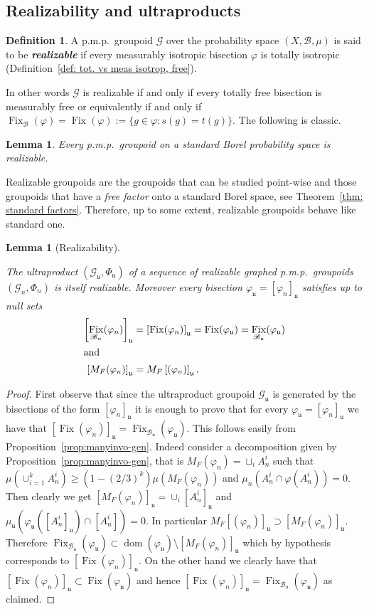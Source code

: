 \documentclass[10pt]{amsart}
\newtheorem{lemm}[cdrthm]{Lemma}
\theoremstyle{definition}
\newtheorem{defi}[cdrthm]{Definition}
\newcommand{\defin}[1]{\textbf{\emph{#1}}}
\newcommand{\cg}{\mathcal{G}}
\newcommand{\rb}{\mathscr{B}}
\DeclareMathOperator{\dom}{dom}
\DeclareMathOperator{\Fix}{Fix}
\newcommand{\ul}{\mathfrak{u}}
\newcommand{\ph}{\varphi}
\newcommand{\pmp}{p.m.p.\ }
\begin{document}
\subsection{Realizability and ultraproducts}\label{subsect: realizability}

\begin{defi}\label{dfn:realizable}
A \pmp groupoid $\cg$ over the probability space $(X,\rb,\mu)$ is said to be
\defin{realizable} if every measurably isotropic bisection $\ph$ is totally isotropic (Definition~\ref{def: tot. vs meas isotrop, free}).
\end{defi}

In other words $\cg$ is realizable if and only if every totally free bisection is measurably free or equivalently if and only if $\Fix_{\rb}({\ph})=\Fix ({\ph}):= \{g\in \ph: s(g)=t(g)\}$. The following is classic.

\begin{lemm}
Every \pmp groupoid on a standard Borel probability space is realizable.
\end{lemm}

Realizable groupoids are the groupoids that can be studied point-wise and those groupoids that have a \emph{free factor} onto a standard Borel space, see Theorem~\ref{thm: standard factors}. Therefore, up to some extent, realizable groupoids behave like standard one.

\begin{lemm}[Realizability]\label{lem:realizab ultralim and fix}

The ultraproduct $(\cg_\ul, \Phi_\ul)$ of a sequence of realizable graphed \pmp groupoids $(\cg_n, \Phi_n)$ is itself realizable. Moreover every bisection $\ph_\ul=[\ph_n]_\ul$ satisfies up to null sets
\begin{align*}
\left[\Fix_{\rb_n}({\ph_n})\right]_{\ul}&= \left[\Fix({\ph_n})\right]_{\ul}= \Fix (\ph_{\ul})=\Fix_{\rb_\ul}(\ph_\ul)\\
\intertext{and}
\left[M_F(\ph_n)\right]_\ul&=M_F\left[(\ph_n)\right]_\ul.
\end{align*}
\end{lemm}
\begin{proof}
First observe that since the ultraproduct groupoid $\cg_\ul$ is generated by the bisections of the form $[\ph_n]_\ul$ it is enough to prove that for every $\ph_\ul=[\ph_n]_\ul$ we have that $[\Fix({\ph_n})]_{\ul}=\Fix_{\rb_\ul}(\ph_\ul)$. This follows easily from Proposition~\ref{prop:manyinvo-gen}. Indeed consider a decomposition given by Proposition~\ref{prop:manyinvo-gen}, that is $M_F(\ph_n)=\sqcup_i A_n^i$ such that $\mu(\cup_{i=1}^k A_n^i) \geq (1-(2/3)^k) \mu(M_F(\ph_n))$ and $\mu_n(A_n^i\cap \ph(A_n^i))=0$. Then clearly we get $[M_F(\ph_n)]_\ul=\cup_i [A_n^i]_\ul$ and $\mu_\ul(\ph_\ul([A_n^i]_\ul)\cap [A_n^i])=0$. In particular $M_F[(\ph_n)]_\ul\supset [M_F(\ph_n)]_\ul$. Therefore $\Fix_{\rb_\ul}(\ph_\ul)\subset \dom(\ph_\ul)\setminus [M_F(\ph_n)]_\ul$ which by hypothesis corresponds to $[\Fix({\ph_n})]_{\ul}$. On the other hand we clearly have that $[\Fix({\ph_n})]_{\ul}\subset \Fix(\ph_\ul)$ and hence $[\Fix({\ph_n})]_{\ul}=\Fix_{\rb_\ul}(\ph_\ul)$ as claimed.
\end{proof}
\end{document}
